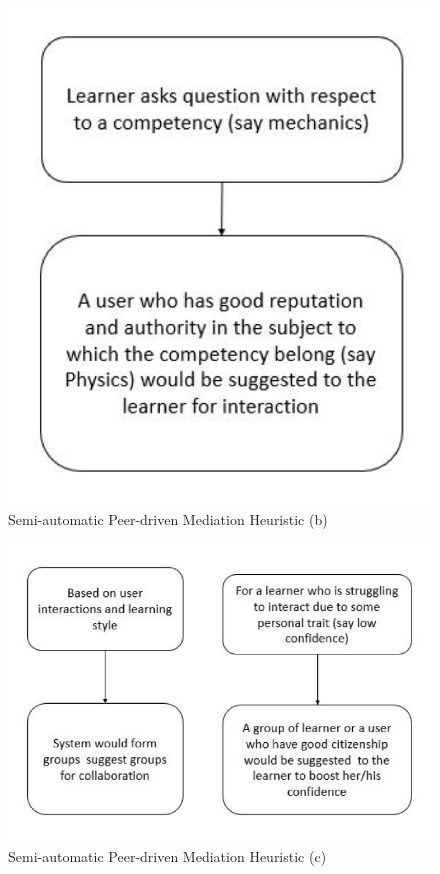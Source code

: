 \begin{multicols}{2}
\begin{figure}[H]
\centering
\includegraphics[scale=.77]{src/Figures/chap2/chap2-fig09.jpg}
\caption{Semi-automatic Peer-driven Mediation Heuristic (b)}\label{chap2-fig09}
\end{figure}

\begin{figure}[H]
\centering
\includegraphics[scale=1.35]{src/Figures/chap2/chap2-fig10.jpg}
\caption{Semi-automatic Peer-driven Mediation Heuristic (c)}\label{chap2-fig10}
\end{figure}


\end{multicols}
